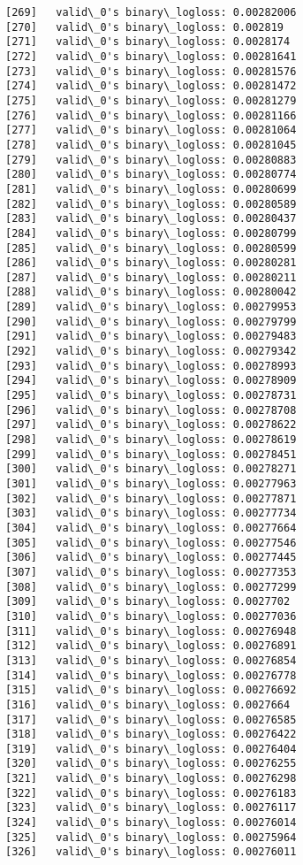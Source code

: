 \documentclass[11pt]{article}
\begin{document}
\begin{Verbatim}[commandchars=\\\{\}]
[269]	valid\_0's binary\_logloss: 0.00282006
[270]	valid\_0's binary\_logloss: 0.002819
[271]	valid\_0's binary\_logloss: 0.0028174
[272]	valid\_0's binary\_logloss: 0.00281641
[273]	valid\_0's binary\_logloss: 0.00281576
[274]	valid\_0's binary\_logloss: 0.00281472
[275]	valid\_0's binary\_logloss: 0.00281279
[276]	valid\_0's binary\_logloss: 0.00281166
[277]	valid\_0's binary\_logloss: 0.00281064
[278]	valid\_0's binary\_logloss: 0.00281045
[279]	valid\_0's binary\_logloss: 0.00280883
[280]	valid\_0's binary\_logloss: 0.00280774
[281]	valid\_0's binary\_logloss: 0.00280699
[282]	valid\_0's binary\_logloss: 0.00280589
[283]	valid\_0's binary\_logloss: 0.00280437
[284]	valid\_0's binary\_logloss: 0.00280799
[285]	valid\_0's binary\_logloss: 0.00280599
[286]	valid\_0's binary\_logloss: 0.00280281
[287]	valid\_0's binary\_logloss: 0.00280211
[288]	valid\_0's binary\_logloss: 0.00280042
[289]	valid\_0's binary\_logloss: 0.00279953
[290]	valid\_0's binary\_logloss: 0.00279799
[291]	valid\_0's binary\_logloss: 0.00279483
[292]	valid\_0's binary\_logloss: 0.00279342
[293]	valid\_0's binary\_logloss: 0.00278993
[294]	valid\_0's binary\_logloss: 0.00278909
[295]	valid\_0's binary\_logloss: 0.00278731
[296]	valid\_0's binary\_logloss: 0.00278708
[297]	valid\_0's binary\_logloss: 0.00278622
[298]	valid\_0's binary\_logloss: 0.00278619
[299]	valid\_0's binary\_logloss: 0.00278451
[300]	valid\_0's binary\_logloss: 0.00278271
[301]	valid\_0's binary\_logloss: 0.00277963
[302]	valid\_0's binary\_logloss: 0.00277871
[303]	valid\_0's binary\_logloss: 0.00277734
[304]	valid\_0's binary\_logloss: 0.00277664
[305]	valid\_0's binary\_logloss: 0.00277546
[306]	valid\_0's binary\_logloss: 0.00277445
[307]	valid\_0's binary\_logloss: 0.00277353
[308]	valid\_0's binary\_logloss: 0.00277299
[309]	valid\_0's binary\_logloss: 0.0027702
[310]	valid\_0's binary\_logloss: 0.00277036
[311]	valid\_0's binary\_logloss: 0.00276948
[312]	valid\_0's binary\_logloss: 0.00276891
[313]	valid\_0's binary\_logloss: 0.00276854
[314]	valid\_0's binary\_logloss: 0.00276778
[315]	valid\_0's binary\_logloss: 0.00276692
[316]	valid\_0's binary\_logloss: 0.0027664
[317]	valid\_0's binary\_logloss: 0.00276585
[318]	valid\_0's binary\_logloss: 0.00276422
[319]	valid\_0's binary\_logloss: 0.00276404
[320]	valid\_0's binary\_logloss: 0.00276255
[321]	valid\_0's binary\_logloss: 0.00276298
[322]	valid\_0's binary\_logloss: 0.00276183
[323]	valid\_0's binary\_logloss: 0.00276117
[324]	valid\_0's binary\_logloss: 0.00276014
[325]	valid\_0's binary\_logloss: 0.00275964
[326]	valid\_0's binary\_logloss: 0.00276011

\end{Verbatim}
\end{document}
